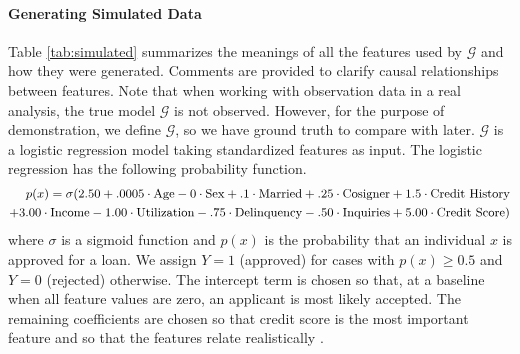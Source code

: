 \documentclass[12pt]{article}    %
\begin{document}
 \paragraph{Generating Simulated Data}

Table \ref{tab:simulated} summarizes the meanings of all the features used by $\mathcal{G}$ and how they were generated. Comments are provided to clarify causal relationships between features.  Note that when working with observation data in a real analysis, the true model $\mathcal{G}$ is not observed. However, for the purpose of demonstration, we define $\mathcal{G}$, so we have ground truth to compare with later. $\mathcal{G}$ is a logistic regression model taking standardized features as input. The logistic regression has the following probability function.
\begin{equation}
\label{eqn:gt}
\small
\begin{split}
 p(x) = \sigma(2.50 +.0005\cdot\text{Age} -0\cdot\text{Sex} +.1 \cdot \text{Married} + .25\cdot \text{Cosigner} + 1.5 \cdot \text{Credit History} \\  + 3.00 \cdot \text{Income} - 1.00\cdot\text{Utilization} -.75 \cdot \text{Delinquency} - .50\cdot\text{Inquiries} + 5.00\cdot\text{Credit Score})
\end{split}
\end{equation}
\noindent where $\sigma$ is a sigmoid function and $p(x)$ is the probability that an individual $x$ is approved for a loan.
We assign $Y = 1$ (approved) for cases with $p(x)\geq 0.5$ and $Y = 0$ (rejected) otherwise. The intercept term is chosen so that, at a baseline when all feature values are zero, an applicant is most likely accepted. The remaining coefficients are chosen so that credit score is the most important feature and so that the features relate realistically \citep{cfb_age,Calcagnini2014,ligons_fico}.%
\end{document}

